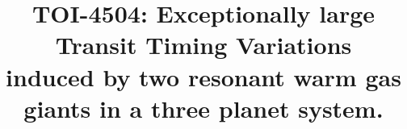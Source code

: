 \documentclass[twocolumn,twocolappendix]{aastex631}
\begin{document}
\title{TOI-4504: Exceptionally
large Transit Timing Variations \\ induced by two resonant warm gas giants in a three planet system.}


\end{document}
